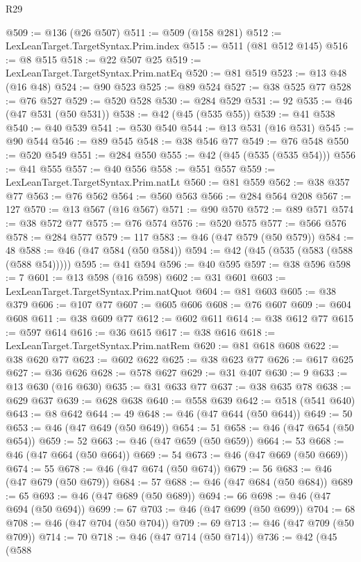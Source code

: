 \begin{lexlean}{R29}
\begin{coremodule}
@509 := @136 (@26 @507)
@511 := @509 (@158 @281)
@512 := LexLeanTarget.TargetSyntax.Prim.index
@515 := @511 (@81 @512 @145)
@516 := @8 @515
@518 := @22 @507 @25
@519 := LexLeanTarget.TargetSyntax.Prim.natEq
@520 := @81 @519
@523 := @13 @48 (@16 @48)
@524 := @90 @523
@525 := @89 @524
@527 := @38 @525 @77
@528 := @76 @527
@529 := @520 @528
@530 := @284 @529
@531 := 92
@535 := @46 (@47 @531 (@50 @531))
@538 := @42 (@45 (@535 @55))
@539 := @41 @538
@540 := @40 @539
@541 := @530 @540
@544 := @13 @531 (@16 @531)
@545 := @90 @544
@546 := @89 @545
@548 := @38 @546 @77
@549 := @76 @548
@550 := @520 @549
@551 := @284 @550
@555 := @42 (@45 (@535 (@535 @54)))
@556 := @41 @555
@557 := @40 @556
@558 := @551 @557
@559 := LexLeanTarget.TargetSyntax.Prim.natLt
@560 := @81 @559
@562 := @38 @357 @77
@563 := @76 @562
@564 := @560 @563
@566 := @284 @564 @208
@567 := 127
@570 := @13 @567 (@16 @567)
@571 := @90 @570
@572 := @89 @571
@574 := @38 @572 @77
@575 := @76 @574
@576 := @520 @575
@577 := @566 @576
@578 := @284 @577
@579 := 117
@583 := @46 (@47 @579 (@50 @579))
@584 := 48
@588 := @46 (@47 @584 (@50 @584))
@594 := @42 (@45 (@535 (@583 (@588 (@588 @54)))))
@595 := @41 @594
@596 := @40 @595
@597 := @38 @596
@598 := 7
@601 := @13 @598 (@16 @598)
@602 := @31 @601
@603 := LexLeanTarget.TargetSyntax.Prim.natQuot
@604 := @81 @603
@605 := @38 @379
@606 := @107 @77
@607 := @605 @606
@608 := @76 @607
@609 := @604 @608
@611 := @38 @609 @77
@612 := @602 @611
@614 := @38 @612 @77
@615 := @597 @614
@616 := @36 @615
@617 := @38 @616
@618 := LexLeanTarget.TargetSyntax.Prim.natRem
@620 := @81 @618 @608
@622 := @38 @620 @77
@623 := @602 @622
@625 := @38 @623 @77
@626 := @617 @625
@627 := @36 @626
@628 := @578 @627
@629 := @31 @407
@630 := 9
@633 := @13 @630 (@16 @630)
@635 := @31 @633 @77
@637 := @38 @635 @78
@638 := @629 @637
@639 := @628 @638
@640 := @558 @639
@642 := @518 (@541 @640)
@643 := @8 @642
@644 := 49
@648 := @46 (@47 @644 (@50 @644))
@649 := 50
@653 := @46 (@47 @649 (@50 @649))
@654 := 51
@658 := @46 (@47 @654 (@50 @654))
@659 := 52
@663 := @46 (@47 @659 (@50 @659))
@664 := 53
@668 := @46 (@47 @664 (@50 @664))
@669 := 54
@673 := @46 (@47 @669 (@50 @669))
@674 := 55
@678 := @46 (@47 @674 (@50 @674))
@679 := 56
@683 := @46 (@47 @679 (@50 @679))
@684 := 57
@688 := @46 (@47 @684 (@50 @684))
@689 := 65
@693 := @46 (@47 @689 (@50 @689))
@694 := 66
@698 := @46 (@47 @694 (@50 @694))
@699 := 67
@703 := @46 (@47 @699 (@50 @699))
@704 := 68
@708 := @46 (@47 @704 (@50 @704))
@709 := 69
@713 := @46 (@47 @709 (@50 @709))
@714 := 70
@718 := @46 (@47 @714 (@50 @714))
@736 := @42
    (@45
      (@588

\end{coremodule}
\end{lexlean}
